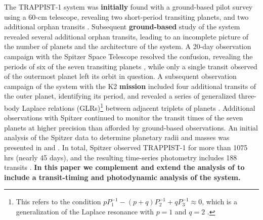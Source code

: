 \documentclass[twocolumn]{aastex63}
\begin{document}
The TRAPPIST-1 system was \textbf{initially} found with a ground-based pilot survey using a 60-cm telescope,
revealing two short-period transiting planets, and two additional orphan transits
\citep{Gillon2016, Burdanov2018}.  Subsequent \textbf{ground-based} study of the system revealed several
additional orphan transits, leading to an incomplete picture of the number of planets
and the architecture of the system.  A 20-day observation campaign with the Spitzer Space
Telescope \textbf{\citep{Werner2004}} resolved the
confusion, revealing the periods of six of the seven transiting planets \citep{Gillon2017},
while only a single transit observed of the outermost planet left its orbit in question.
A subsequent observation campaign of the system with the K2 \textbf{mission} included four
additional transits of the outer planet, identifying its period, and revealed a series
of generalized three-body Laplace relations (GLRs)\footnote{This refers to the condition
$pP_1^{-1}-(p+q)P_2^{-1}+qP_3^{-1} \approx 0$, which is a generalization of the Laplace
resonance with $p=1$ and $q=2$ \citep{Papaloizou2014}. } between adjacent triplets of
planets \citep{Luger2017a}.  Additional observations with Spitzer
continued to monitor the transit times of the seven planets at higher precision than
afforded by ground-based observations. An initial analysis of the Spitzer data to determine
planetary radii and masses was presented in \citet{Delrez2018a} and \citet{Grimm2018}. In total,
Spitzer observed TRAPPIST-1 for more than 1075 hrs (nearly 45 days), and the resulting time-series 
photometry includes 188 transits \citep{Ducrot2020}. \textbf{In this paper we complement and
extend the analysis of \citet{Ducrot2020} to include a transit-timing and photodynamic
analysis of the system.}
\end{document}
